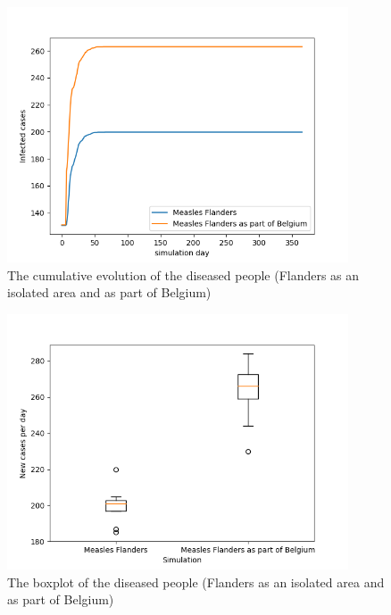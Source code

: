\documentclass[runningheads]{llncs}
\begin{document}
	\begin{figure}
		\centering
		\centering
		\includegraphics[width=0.9\textwidth]{FL1_FL2_sim_infected.png}
		\caption{The cumulative evolution of the diseased people (Flanders as an isolated area and as part of Belgium)}	
		\label{fig13}
	\end{figure}
	\begin{figure}
		\centering
		\centering
		\includegraphics[width=0.9\textwidth]{FL1_FL2_sim_boxplot.png}
		\caption{The boxplot of the diseased people (Flanders as an isolated area and as part of Belgium)}	
		\label{fig14}
	\end{figure}
\end{document}
